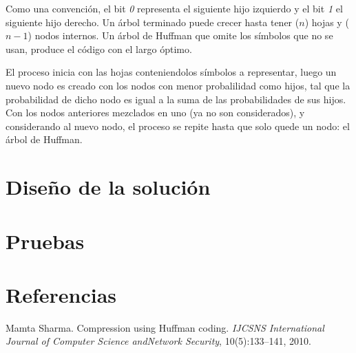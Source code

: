 \documentclass{IEEEtran}
\begin{document}
Como una convenci\'on, el bit \emph{0} representa el siguiente hijo izquierdo y el bit \emph{1} el siguiente hijo derecho. Un \'arbol terminado puede crecer hasta tener ($n$) hojas y ($n - 1$) nodos internos. Un \'arbol de Huffman que omite los s\'imbolos que no se usan, produce el c\'odigo con el largo \'optimo.

El proceso inicia con las hojas conteniendolos s\'imbolos a representar, luego un nuevo nodo es creado con los nodos con menor probalilidad como hijos, tal que la probabilidad de dicho nodo es igual a la suma de las probabilidades de sus hijos. Con los nodos anteriores mezclados en uno (ya no son considerados), y considerando al nuevo nodo, el proceso se repite hasta que solo quede un nodo: el \'arbol de Huffman.
\section{Dise\~no de la soluci\'on}

\section{Pruebas}

\section{Referencias}

\begin{thebibliography}{99}

 Mamta  Sharma.   Compression  using  Huffman  coding. \emph{IJCSNS International Journal of Computer Science andNetwork Security}, 10(5):133–141, 2010.
\end{thebibliography}
\end{document}
